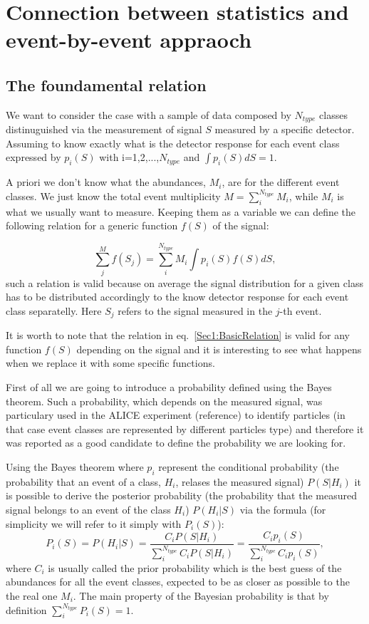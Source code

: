 \section{Connection between statistics and event-by-event appraoch}
\subsection{The foundamental relation}
We want to consider the case with a sample of data composed by $N_{type}$ classes distinuguished via the measurement of signal $S$ measured by a specific detector.
Assuming to know exactly what is the detector response for each event class expressed by $p_{i}(S)$ with i=1,2,...,$N_{type}$ and $\int p_{i}(S) dS = 1$.

A priori we don't know what the abundances, $M_{i}$, are for the different
event classes. We just know the total event multiplicity $M =
\sum\limits_{i}^{N_{type}} M_{i}$, while $M_i$ is what we usually want to measure.
Keeping them as a variable we can define the following relation for a generic function $f(S)$ of the signal:

\begin{equation}
\label{Sec1:BasicRelation}
\sum\limits_{j}^{M} f(S_j) = \sum\limits_{i}^{N_{type}} M_{i} \int p_{i}(S) f(S) dS,
\end{equation}
such a relation is valid because on average the signal distribution for a
given class has to be distributed accordingly to the know detector response
for each event class separatelly. Here  $S_j$ refers to the signal
measured in the $j$-th event.

It is worth to note that the relation in eq.~\ref{Sec1:BasicRelation} is valid
for any function $f(S)$ depending on the signal and
it is interesting to see what happens when we replace it with some specific functions.

First of all we are going to introduce a probability defined using the Bayes theorem. Such a probability, which depends on the measured signal, was particulary used in the ALICE experiment (reference) to identify particles (in that case event classes are represented by different particles type) and therefore it was reported as a good candidate to define the probability we are looking for.

Using the Bayes theorem where $p_{i}$ represent the conditional probability (the probability that an event of a class, $H_{i}$, relases the measured signal) $P(S|H_{i})$ it is possible to derive the posterior probability (the probability that the measured signal belongs to an event of the class $H_{i}$) $P(H_{i}|S)$ via the formula (for simplicity we will refer to it simply with $P_{i}(S)$):
\begin{equation}
\label{Sec1:BayesianProb}
P_{i}(S) = P(H_{i}|S) = \frac{C_{i} P(S|H_{i})}{\sum\limits_{i}^{N_{type}}C_{i} P(S|H_{i})} = \frac{C_{i} p_{i}(S)}{\sum\limits_{i}^{N_{type}}C_{i} p_{i}(S)},
\end{equation}
where $C_{i}$ is usually called the prior probability which is the best guess of the abundances for all the event classes, expected to be as closer as possible to the the real one $M_{i}$. The main property of the Bayesian probability is that by definition $\sum\limits_{i}^{N_{type}} P_{i}(S) = 1$.

